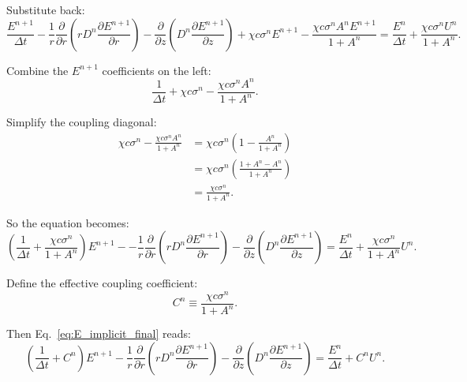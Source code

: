 \documentclass[12pt,oneside]{article}
\begin{document}
Substitute back:
\begin{equation}
\frac{E^{n+1}}{\Delta t}
-
\frac{1}{r}\frac{\partial}{\partial r}\left(rD^n\frac{\partial E^{n+1}}{\partial r}\right) 
-
\frac{\partial}{\partial z}\left(D^n\frac{\partial E^{n+1}}{\partial z}\right)
+
\chi c\sigma^n E^{n+1}
-
\frac{\chi c\sigma^n A^n E^{n+1}}{1 + A^n}
=
\frac{E^n}{\Delta t}
+
\frac{\chi c\sigma^n U^n}{1 + A^n}.
\end{equation}

Combine the $E^{n+1}$ coefficients on the left:
\begin{equation}
\frac{1}{\Delta t} + \chi c\sigma^n - \frac{\chi c\sigma^n A^n}{1 + A^n}.
\end{equation}

Simplify the coupling diagonal:
\begin{align}
\chi c\sigma^n - \frac{\chi c\sigma^n A^n}{1 + A^n}
&=
\chi c\sigma^n\left(1 - \frac{A^n}{1 + A^n}\right)\\
&=
\chi c\sigma^n\left(\frac{1 + A^n - A^n}{1 + A^n}\right)\\
&=
\frac{\chi c\sigma^n}{1 + A^n}.
\end{align}

So the equation becomes:
\begin{equation}
\left(\frac{1}{\Delta t} + \frac{\chi c\sigma^n}{1 + A^n}\right) E^{n+1}
-
-
\frac{1}{r}\frac{\partial}{\partial r}\left(rD^n\frac{\partial E^{n+1}}{\partial r}\right) 
-
\frac{\partial}{\partial z}\left(D^n\frac{\partial E^{n+1}}{\partial z}\right)
=
\frac{E^n}{\Delta t}
+
\frac{\chi c\sigma^n}{1 + A^n} U^n.
\label{eq:E_implicit_final}
\end{equation}

Define the effective coupling coefficient:
\begin{equation}
C^n
\equiv
\frac{\chi c\sigma^n}{1 + A^n}.
\end{equation}

Then Eq.~\eqref{eq:E_implicit_final} reads:
\begin{equation}
\left(\frac{1}{\Delta t} + C^n\right) E^{n+1}
-
\frac{1}{r}\frac{\partial}{\partial r}\left(rD^n\frac{\partial E^{n+1}}{\partial r}\right) 
-
\frac{\partial}{\partial z}\left(D^n\frac{\partial E^{n+1}}{\partial z}\right)
=
\frac{E^n}{\Delta t}
+
C^n U^n.
\label{eq:E_final_coupled}
\end{equation}

\end{document}
